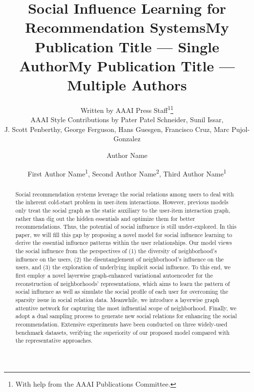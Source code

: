 \documentclass[letterpaper]{article} %
\title{Social Influence Learning for Recommendation Systems}
\author{
    Written by AAAI Press Staff\textsuperscript{\rm 1}\thanks{With help from the AAAI Publications Committee.}\\
    AAAI Style Contributions by Pater Patel Schneider,
    Sunil Issar,\\
    J. Scott Penberthy,
    George Ferguson,
    Hans Guesgen,
    Francisco Cruz\equalcontrib,
    Marc Pujol-Gonzalez\equalcontrib
}
\title{My Publication Title --- Single Author}
\author {
    Author Name
}
\title{My Publication Title --- Multiple Authors}
\author {
    First Author Name\textsuperscript{\rm 1},
    Second Author Name\textsuperscript{\rm 2},
    Third Author Name\textsuperscript{\rm 1}
}
\begin{document}
\maketitle

\begin{abstract}
Social recommendation systems leverage the social relations among users to deal with the inherent cold-start problem in user-item interactions. However, previous models only treat the social graph as the static auxiliary to the user-item interaction graph, rather than dig out the hidden essentials and optimize them for better recommendations. Thus, the potential of social influence is still under-explored. In this paper, we will fill this gap by proposing a novel model for social influence learning to derive the essential influence patterns within the user relationships. Our model views the social influence from the perspectives of (1) the diversity of neighborhood's influence on the users, (2) the disentanglement of neighborhood's influence on the users, and (3) the exploration of underlying implicit social influence. To this end, we first employ a novel layerwise graph-enhanced variational autoencoder for the reconstruction of neighborhoods' representations, which aims to learn the pattern of social influence as well as simulate the social profile of each user for overcoming the sparsity issue in social relation data. Meanwhile, we introduce a layerwise graph attentive network for capturing the most influential scope of neighborhood. Finally, we adopt a dual sampling process to generate new social relations for enhancing the social recommendation. Extensive experiments have been conducted on three widely-used benchmark datasets, verifying the superiority of our proposed model compared with the representative approaches.
\end{abstract}
\end{document}
